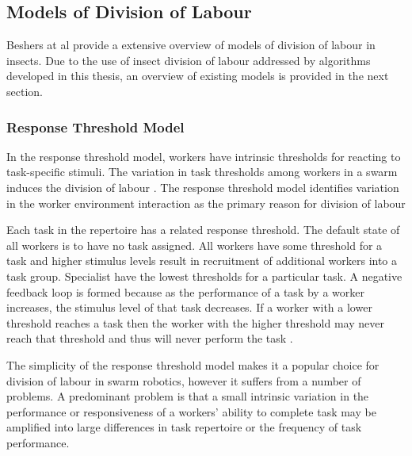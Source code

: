 
\subsection{Models of Division of Labour}

Beshers at al \cite{beshers2001models} provide a extensive overview of models of division of labour in insects. Due to the use of insect division of labour addressed by algorithms developed in this thesis, an overview of existing models is provided in the next section.

\subsubsection{Response Threshold Model}

In the response threshold model, workers have intrinsic thresholds for reacting to task-specific stimuli. The variation in task thresholds among workers in a swarm induces the division of labour \cite{robinson1992regulation}. The response threshold model identifies variation in the worker environment interaction as the primary reason for division of labour

Each task in the repertoire has a related response threshold. The default state of all workers is to have no task assigned. All workers have some threshold for a task and higher stimulus levels result in recruitment of additional workers into a task group. Specialist have the lowest thresholds for a particular task. A negative feedback loop is formed because as the performance of a task by a worker increases, the stimulus level of that task decreases. If a worker with a lower threshold reaches a task then the worker with the higher threshold may never reach that threshold and thus will never perform the task \cite{beshers2001models}.

The simplicity of the response threshold model makes it a popular choice for division of labour in swarm robotics, however it suffers from a number of problems. A predominant problem is that a small intrinsic variation in the performance or responsiveness of a workers' ability to complete task may be amplified into large differences in task repertoire or the frequency of task performance. 

